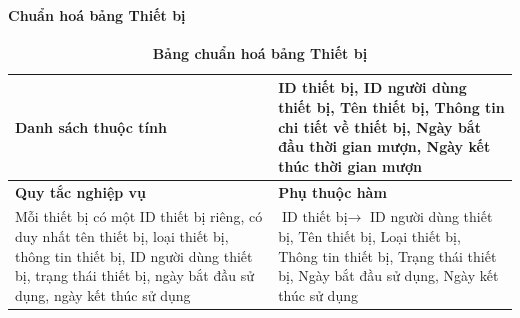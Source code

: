 \paragraph{Chuẩn hoá bảng Thiết bị}
\mbox{}
\begin{table}[H]
	\caption{\bfseries \fontsize{12pt}{0pt}\selectfont Bảng chuẩn hoá bảng Thiết bị}
	\centering
	\begin{tabularx}{0.9\textwidth}{|X|X|}
		\hline
		\textbf{Danh sách thuộc tính} & ID thiết bị, ID người dùng thiết bị, Tên thiết bị, Thông tin chi tiết về thiết bị, Ngày bắt đầu thời gian mượn, Ngày kết thúc thời gian mượn \\
		\hline
		\textbf{Quy tắc nghiệp vụ}    & \textbf{Phụ thuộc hàm}                                                                                                                       \\
		\hline
		Mỗi thiết bị có một ID thiết bị riêng, có duy nhất tên thiết bị, loại thiết bị, thông tin thiết bị,
		ID người dùng thiết bị, trạng thái thiết bị, ngày bắt đầu sử dụng, ngày kết thúc sử dụng
		                              & \parbox[t]{\linewidth}{$\text{ID thiết bị} \rightarrow$ ID người dùng thiết bị, Tên thiết bị,
		Loại thiết bị, Thông tin thiết bị, Trạng thái thiết bị, Ngày bắt đầu sử dụng, Ngày kết thúc sử dụng}                                                                         \\
		\hline
		                                                                                                  \\
		                                                                                                            \\
		\hline
	\end{tabularx}
\end{table}

